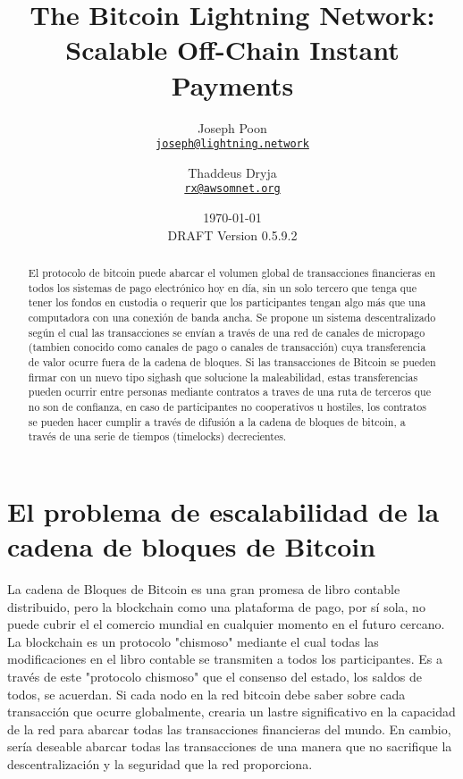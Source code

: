 \documentclass[letterpaper,11pt]{article}
\title{\LARGE The Bitcoin Lightning Network:\\
	\Large Scalable Off-Chain Instant Payments}
\author{
		Joseph Poon\\
		\small\href{mailto:joseph@lightning.network}
			{\nolinkurl{joseph@lightning.network}}
	\and 
		Thaddeus Dryja\\
		\small\href{mailto:rx@awsomnet.org}
			{\nolinkurl{rx@awsomnet.org}}
	}
\date{\today\\\small DRAFT Version 0.5.9.2}
\begin{document}
\maketitle

\begin{abstract}

El protocolo de bitcoin puede abarcar el volumen global de transacciones financieras en
todos los sistemas de pago electrónico hoy en día, sin un solo tercero que tenga que
tener los fondos en custodia o requerir que los participantes tengan algo más que una computadora
con una conexión de banda ancha. Se propone un sistema descentralizado según el cual
las transacciones se envían a través de una red de canales de micropago (tambien conocido como
canales de pago o canales de transacción) cuya transferencia de valor ocurre
fuera de la cadena de bloques. Si las transacciones de Bitcoin se pueden firmar con un nuevo tipo sighash
que solucione la maleabilidad, estas transferencias pueden ocurrir entre personas mediante contratos 
a traves de una ruta de terceros que no son de confianza, en caso de
participantes no cooperativos u hostiles, los contratos se pueden hacer cumplir a través de difusión a la
cadena de bloques de bitcoin, a través de una serie de tiempos (timelocks) decrecientes.

\end{abstract}

\section{El problema de escalabilidad de la cadena de bloques de Bitcoin}

La cadena de Bloques de Bitcoin\cite{nakamoto} es una gran promesa de libro contable
distribuido, pero la blockchain como una plataforma de pago, por sí sola, no puede cubrir el
el comercio mundial en cualquier momento en el futuro cercano. La blockchain es un protocolo "chismoso"
mediante el cual todas las modificaciones en el libro contable se transmiten a todos
los participantes. Es a través de este "protocolo chismoso" que el consenso del 
estado, los saldos de todos, se acuerdan. Si cada nodo en la red bitcoin
debe saber sobre cada transacción que ocurre globalmente, crearia
un lastre significativo en la capacidad de la red para abarcar todas las transacciones financieras
del mundo. En cambio, sería deseable abarcar todas las
transacciones de una manera que no sacrifique la descentralización y la seguridad
que la red proporciona.
\end{document}
